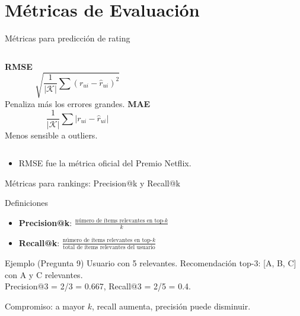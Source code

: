 \documentclass[aspectratio=169, 10pt, xcolor=table]{beamer}
\begin{document}
\section{Métricas de Evaluación}

\begin{frame}{Métricas para predicción de rating}
    \begin{columns}[t]
        \textbf{RMSE}
        \[
        \sqrt{\frac{1}{|\mathcal{K}|}\sum (r_{ui} - \hat{r}_{ui})^2}
        \]
        Penaliza más los errores grandes.
        \textbf{MAE}
        \[
        \frac{1}{|\mathcal{K}|}\sum |r_{ui} - \hat{r}_{ui}|
        \]
        Menos sensible a outliers.
    \end{columns}
    \vspace{0.3cm}
    \begin{itemize}
        \item RMSE fue la métrica oficial del Premio Netflix.
    \end{itemize}
\end{frame}

\begin{frame}{Métricas para rankings: Precision@k y Recall@k}
    \begin{block}{Definiciones}
        \begin{itemize}
            \item \textbf{Precision@k}: $\frac{\text{número de ítems relevantes en top-}k}{k}$
            \item \textbf{Recall@k}: $\frac{\text{número de ítems relevantes en top-}k}{\text{total de ítems relevantes del usuario}}$
        \end{itemize}
    \end{block}
    \begin{exampleblock}{Ejemplo (Pregunta 9)}
        Usuario con 5 relevantes. Recomendación top-3: [A, B, C] con A y C relevantes.\\
        Precision@3 = 2/3 = 0.667, Recall@3 = 2/5 = 0.4.
    \end{exampleblock}
    Compromiso: a mayor $k$, recall aumenta, precisión puede disminuir.
\end{frame}
\end{document}
